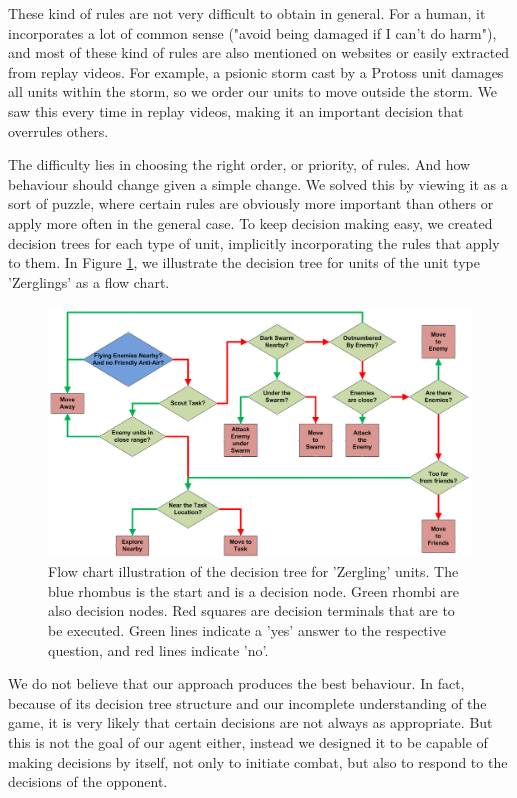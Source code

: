 These kind of rules are not very difficult to obtain in general. For a human, it incorporates a lot of common sense ("avoid being damaged if I can't do harm"), and most of these kind of rules are also mentioned on websites or easily extracted from replay videos. For example, a psionic storm cast by a Protoss unit damages all units within the storm, so we order our units to move outside the storm. We saw this every time in replay videos, making it an important decision that overrules others. 

The difficulty lies in choosing the right order, or priority, of rules. And how behaviour should change given a simple change. We solved this by viewing it as a sort of puzzle, where certain rules are obviously more important than others or apply more often in the general case. To keep decision making easy, we created decision trees for each type of unit, implicitly incorporating the rules that apply to them. In Figure \ref{fig:micro}, we illustrate the decision tree for units of the unit type 'Zerglings' as a flow chart.

\begin{figure}
\centering
\includegraphics[scale=0.35]{starcraft_zerg_diagram_groot}
\caption{\label{fig:micro} Flow chart illustration of the decision tree for 'Zergling' units. The blue rhombus is the start and is a decision node. Green rhombi are also decision nodes. Red squares are decision terminals that are to be executed. Green lines indicate a 'yes' answer to the respective question, and red lines indicate 'no'.}
\end{figure}

We do not believe that our approach produces the best behaviour. In fact, because of its decision tree structure and our incomplete understanding of the game, it is very likely that certain decisions are not always as appropriate. But this is not the goal of our agent either, instead we designed it to be capable of making decisions by itself, not only to initiate combat, but also to respond to the decisions of the opponent.

